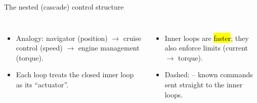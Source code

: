 \documentclass[aspectratio=169,10pt]{beamer}
\newcommand{\src}[1]{\par\vfill\hfill{\color{mkGray}\fontsize{6}{7}\selectfont #1}}
\begin{document}
\begin{frame}[t]{The nested (cascade) control structure}
\begin{columns}[T,onlytextwidth]
\begin{itemize}\small
\item Analogy: navigator (position) $\to$ cruise control (speed) $\to$ engine management (torque).
\item Each loop treats the closed inner loop as its ``actuator''.
\end{itemize}
\begin{itemize}\small
\item Inner loops are \hl{faster}; they also enforce limits (current $\to$ torque).
\item Dashed:  -- known commands sent straight to the inner loops.
\end{itemize}
\end{columns}
\src{[Ellis, 2012]}
\end{frame}
\end{document}
